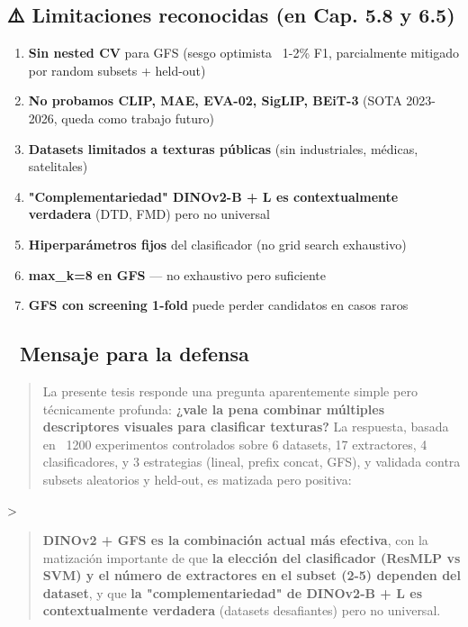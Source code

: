 \hrulefill

\subsection{⚠️ Limitaciones reconocidas (en Cap. 5.8 y 6.5)}

\begin{enumerate}
  \item \textbf{Sin nested CV} para GFS (sesgo optimista ~1-2\% F1, parcialmente mitigado por random subsets + held-out)
  \item \textbf{No probamos CLIP, MAE, EVA-02, SigLIP, BEiT-3} (SOTA 2023-2026, queda como trabajo futuro)
  \item \textbf{Datasets limitados a texturas públicas} (sin industriales, médicas, satelitales)
  \item \textbf{"Complementariedad" DINOv2-B + L es contextualmente verdadera} (DTD, FMD) pero no universal
  \item \textbf{Hiperparámetros fijos} del clasificador (no grid search exhaustivo)
  \item \textbf{max\_k=8 en GFS} --- no exhaustivo pero suficiente
  \item \textbf{GFS con screening 1-fold} puede perder candidatos en casos raros
\end{enumerate}

\hrulefill

\subsection{🎯 Mensaje para la defensa}

\begin{quote}
La presente tesis responde una pregunta aparentemente simple pero técnicamente profunda: \textbf{¿vale la pena combinar múltiples descriptores visuales para clasificar texturas?} La respuesta, basada en ~1200 experimentos controlados sobre 6 datasets, 17 extractores, 4 clasificadores, y 3 estrategias (lineal, prefix concat, GFS), y validada contra subsets aleatorios y held-out, es matizada pero positiva:
\end{quote}
>
\begin{quote}
\textbf{DINOv2 + GFS es la combinación actual más efectiva}, con la matización importante de que \textbf{la elección del clasificador (ResMLP vs SVM) y el número de extractores en el subset (2-5) dependen del dataset}, y que \textbf{la "complementariedad" de DINOv2-B + L es contextualmente verdadera} (datasets desafiantes) pero no universal.
\end{quote}

